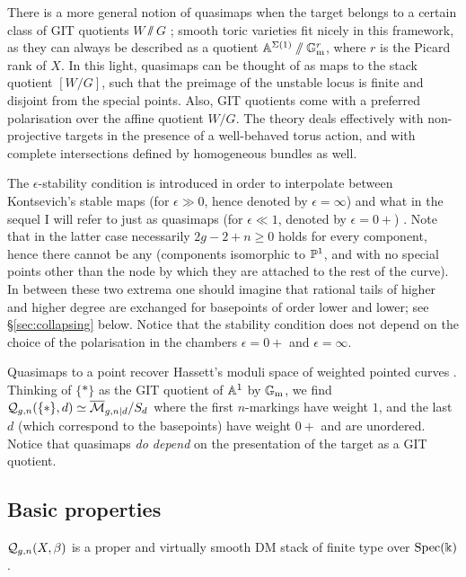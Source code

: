 \begin{rmk}
 There is a more general notion of quasimaps when the target belongs to a certain class of GIT quotients $W\sslash G$ \cite{CFKM}; smooth toric varieties fit nicely in this framework, as they can always be described as a quotient $\mathbb{A}^{\Sigma(1)}\sslash\mathbb{G}_{\text{m}}^r$, where $r$ is the Picard rank of $X$. In this light, quasimaps can be thought of as maps to the stack quotient $[W/G]$, such that the preimage of the unstable locus is finite and disjoint from the special points. Also, GIT quotients come with a preferred polarisation over the affine quotient $W/G$. The theory deals effectively with non-projective targets in the presence of a well-behaved torus action, and with complete intersections defined by homogeneous bundles as well.
\end{rmk}
\begin{rmk}
 The $\epsilon$-stability condition is introduced in order to interpolate between Kontsevich's stable maps (for $\epsilon\gg 0$, hence denoted by $\epsilon=\infty$) and what in the sequel I will refer to just as quasimaps (for $\epsilon\ll1$, denoted by $\epsilon=0+$) . Note that in the latter case necessarily $2g-2+n \geq 0$ holds for every component, hence there cannot be any  (components isomorphic to $\mathbb P^1$, and with no special points other than the node by which they are attached to the rest of the curve). In between these two extrema one should imagine that rational tails of higher and higher degree are exchanged for basepoints of order lower and lower; see \S \ref{sec:collapsing} below. Notice that the stability condition does not depend on the choice of the polarisation in the chambers $\epsilon=0+$ \cite[Lemma 3.1.3]{CF-K} and $\epsilon=\infty$.
\end{rmk}

\begin{ex}\label{ex:qm_to_pt}
 Quasimaps to a point recover Hassett's moduli space of weighted pointed curves \cite{Hassett}. Thinking of $\{*\}$ as the GIT quotient of $\mathbb{A}^1$ by $\mathbb{G}_{\text{m}}$, we find $\mathcal{Q}_{g,n}(\{*\},d)\simeq \overline{\mathcal{M}}_{g,n|d}/S_d$ where the first $n$-markings have weight $1$, and the last $d$ (which correspond to the basepoints) have weight $0+$ and are unordered. Notice that quasimaps \emph{do depend} on the presentation of the target as a GIT quotient.
\end{ex}

\subsection{Basic properties}\label{sec:basic_qm}
\begin{thm}\cite[Theorems 3.2.1 and 4.0.1]{CF-K}
 $\mathcal{Q}_{g,n}(X,\beta)$ is a proper and virtually smooth DM stack of finite type over $\operatorname{Spec}(\Bbbk)$.
\end{thm}

